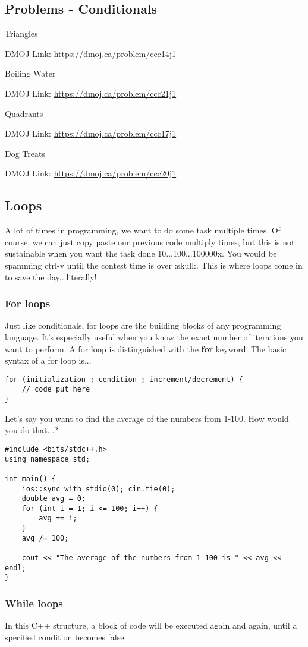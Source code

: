 \documentclass{report}
\newcommand{\problem}[2]{
    \begin{problembox}
        #1
        
        DMOJ Link: \href{#2}{#2}
    \end{problembox}
}
\begin{document}
\subsection{Problems - Conditionals}
\problem{Triangles}{https://dmoj.ca/problem/ccc14j1}
\problem{Boiling Water}{https://dmoj.ca/problem/ccc21j1}
\problem{Quadrants}{https://dmoj.ca/problem/ccc17j1}
\problem{Dog Treats}{https://dmoj.ca/problem/ccc20j1}

\subsection{Loops}
A lot of times in programming, we want to do some task multiple times. Of course, we can just copy paste our previous code multiply times, but this is not sustainable when you want the task done 10...100...100000x. You would be spamming ctrl-v until the contest time is over :skull:. This is where loops come in to save the day...literally!
\subsubsection{For loops}
Just like conditionals, for loops are the building blocks of any programming language. It's especially useful when you know the exact number of iterations you want to perform. A for loop is distinguished with the \textbf{for} keyword. The basic syntax of a for loop is...

\begin{lstlisting}[caption=For loop syntax]
for (initialization ; condition ; increment/decrement) {
    // code put here
}
\end{lstlisting}

Let's say you want to find the average of the numbers from 1-100. How would you do that...?

\begin{lstlisting}[caption=Average from 1-100]
#include <bits/stdc++.h>
using namespace std;

int main() {
    ios::sync_with_stdio(0); cin.tie(0);
    double avg = 0;
    for (int i = 1; i <= 100; i++) {
        avg += i;
    }
    avg /= 100;

    cout << "The average of the numbers from 1-100 is " << avg << endl;
}
\end{lstlisting}

\subsubsection{While loops}
In this C++ structure, a block of code will be executed again and again, until a specified condition becomes false.
\end{document}
